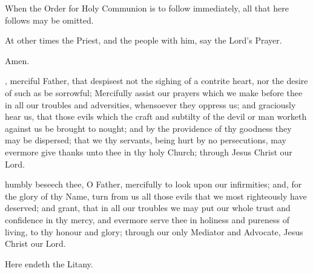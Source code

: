 \begin{rubric}
When the Order for Holy Communion is to follow immediately, all that here follows may be omitted.
\end{rubric}

\newpage

\begin{rubric}
At other times the Priest, and the people with him, say the Lord's Prayer.
\end{rubric}


Amen.



, merciful Father, that despisest not the sighing of a contrite heart, nor the desire of such as be sorrowful; Mercifully assist our prayers which we make before thee in all our troubles and adversities, whensoever they oppress us; and graciously hear us, that those evils which the craft and subtilty of the devil or man worketh against us be brought to nought; and by the providence of thy goodness they may be dispersed; that we thy servants, being hurt by no persecutions, may evermore give thanks unto thee in thy holy Church; through Jesus Christ our Lord.


\newpage


 humbly beseech thee, O Father, mercifully to look upon our infirmities; and, for the glory of thy Name, turn from us all those evils that we most righteously have deserved; and grant, that in all our troubles we may put our whole trust and confidence in thy mercy, and evermore serve thee in holiness and pureness of living, to thy honour and glory; through our only Mediator and Advocate, Jesus Christ our Lord.



\begin{rubric}
Here endeth the Litany.
\end{rubric}

\clearpage

